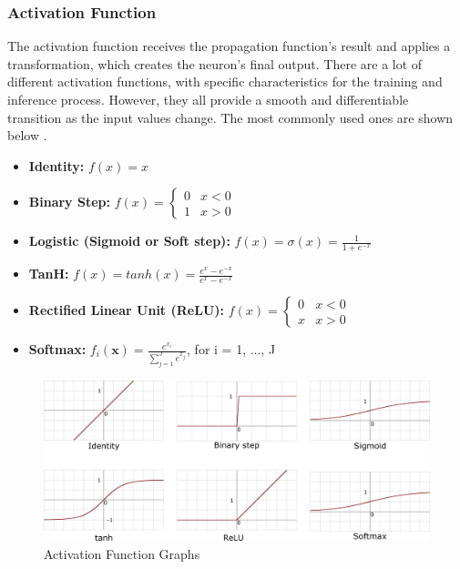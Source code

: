 \subsubsection{Activation Function}
The activation function receives the propagation function's result and applies a transformation, which creates the neuron's final output. There are a lot of different activation functions, with specific characteristics for the training and inference process. However, they all provide a smooth and differentiable transition as the input values change. The most commonly used ones are shown below \cite{Activation-Function-Wikipedia}.
\begin{itemize}
	\item \textbf{Identity:} $f(x) = x$

	\item \textbf{Binary Step:} $
		      f(x) =
		      \begin{cases}
			      0 & x < 0 \\
			      1 & x > 0
		      \end{cases}
	      $

	\item \textbf{Logistic (Sigmoid or Soft step):} $
		      f(x) = \sigma(x) = \frac{1}{1 + e^{-x}}
	      $

	\item \textbf{TanH:} $
		      f(x) = tanh(x) = \frac{e^{x} - e^{-x}}{e^{x} - e^{-x}}
	      $

	\item \textbf{Rectified Linear Unit (ReLU):} $
		      f(x) =
		      \begin{cases}
			      0 & x < 0 \\
			      x & x > 0
		      \end{cases}
	      $

	\item \textbf{Softmax:} $
		      f_i(\textbf{x}) = \frac{
		      e^{x_i}
		      }{
		      \sum_{j=1}^{J}e^{x_j}
		      }
	      $, for i = 1, ..., J
\end{itemize}

\begin{figure} [ht]
	\centering
	\includegraphics[width=\textwidth]{Images/Activation_functions.png}
	\decoRule
	\caption[Activation Function Graphs]{Activation Function Graphs}
	\label{fig:activation-functions}
\end{figure}

